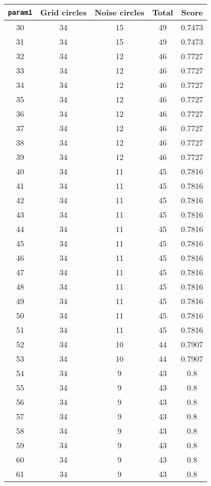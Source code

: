 \documentclass[letterpaper, 12pt]{article}
\begin{document}
\begin{longtable}{|c|c|c|c|c|}
\hline
\textbf{\texttt{param1}} & \textbf{Grid circles} & \textbf{Noise circles} & \textbf{Total} & \textbf{Score} \\
\hline
30 & 34 & 15 & 49 & 0.7473 \\
\hline
31 & 34 & 15 & 49 & 0.7473 \\
\hline
32 & 34 & 12 & 46 & 0.7727 \\
\hline
33 & 34 & 12 & 46 & 0.7727 \\
\hline
34 & 34 & 12 & 46 & 0.7727 \\
\hline
35 & 34 & 12 & 46 & 0.7727 \\
\hline
36 & 34 & 12 & 46 & 0.7727 \\
\hline
37 & 34 & 12 & 46 & 0.7727 \\
\hline
38 & 34 & 12 & 46 & 0.7727 \\
\hline
39 & 34 & 12 & 46 & 0.7727 \\
\hline
40 & 34 & 11 & 45 & 0.7816 \\
\hline
41 & 34 & 11 & 45 & 0.7816 \\
\hline
42 & 34 & 11 & 45 & 0.7816 \\
\hline
43 & 34 & 11 & 45 & 0.7816 \\
\hline
44 & 34 & 11 & 45 & 0.7816 \\
\hline
45 & 34 & 11 & 45 & 0.7816 \\
\hline
46 & 34 & 11 & 45 & 0.7816 \\
\hline
47 & 34 & 11 & 45 & 0.7816 \\
\hline
48 & 34 & 11 & 45 & 0.7816 \\
\hline
49 & 34 & 11 & 45 & 0.7816 \\
\hline
50 & 34 & 11 & 45 & 0.7816 \\
\hline
51 & 34 & 11 & 45 & 0.7816 \\
\hline
52 & 34 & 10 & 44 & 0.7907 \\
\hline
53 & 34 & 10 & 44 & 0.7907 \\
\hline
54 & 34 & 9 & 43 & 0.8 \\
\hline
55 & 34 & 9 & 43 & 0.8 \\
\hline
56 & 34 & 9 & 43 & 0.8 \\
\hline
57 & 34 & 9 & 43 & 0.8 \\
\hline
58 & 34 & 9 & 43 & 0.8 \\
\hline
59 & 34 & 9 & 43 & 0.8 \\
\hline
60 & 34 & 9 & 43 & 0.8 \\
\hline
61 & 34 & 9 & 43 & 0.8 \\

\end{longtable}
\end{document}
